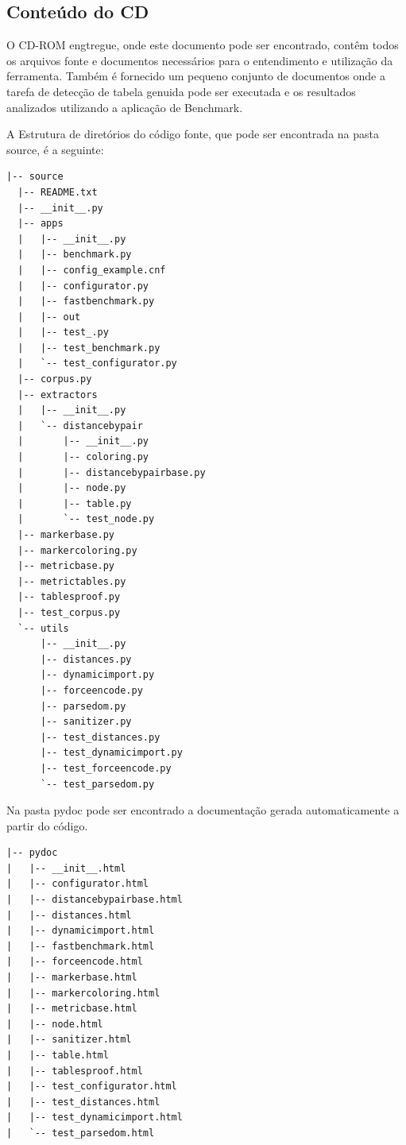 \documentclass[12pt, a4paper]{article}
\newcommand{\remove}[1]{}
\begin{document}
\remove{
A documentação do código foi realizada utilizando outro modelo padrão de
Python, o pydoc, e pode ser encontrada na pasta raiz do projeto em
formato HTML para facilitar a leitura e a busca por alguma
funcionalidade específica.
}

\subsection{Conteúdo do CD}

O CD-ROM engtregue, onde este documento pode ser encontrado, contêm
todos os arquivos fonte e documentos necessários para o entendimento e
utilização da ferramenta. Também é fornecido um pequeno conjunto de
documentos onde a tarefa de detecção de tabela genuida pode ser
executada e os resultados analizados utilizando a aplicação de Benchmark.

A Estrutura de diretórios do código fonte, que pode ser encontrada na
pasta source, é a seguinte:

\begin{verbatim}
|-- source
  |-- README.txt 
  |-- __init__.py
  |-- apps
  |   |-- __init__.py
  |   |-- benchmark.py
  |   |-- config_example.cnf
  |   |-- configurator.py
  |   |-- fastbenchmark.py
  |   |-- out
  |   |-- test_.py
  |   |-- test_benchmark.py
  |   `-- test_configurator.py
  |-- corpus.py
  |-- extractors
  |   |-- __init__.py
  |   `-- distancebypair
  |       |-- __init__.py
  |       |-- coloring.py
  |       |-- distancebypairbase.py
  |       |-- node.py
  |       |-- table.py
  |       `-- test_node.py
  |-- markerbase.py
  |-- markercoloring.py
  |-- metricbase.py
  |-- metrictables.py
  |-- tablesproof.py
  |-- test_corpus.py
  `-- utils
      |-- __init__.py
      |-- distances.py
      |-- dynamicimport.py
      |-- forceencode.py
      |-- parsedom.py
      |-- sanitizer.py
      |-- test_distances.py
      |-- test_dynamicimport.py
      |-- test_forceencode.py
      `-- test_parsedom.py
\end{verbatim}

Na pasta pydoc pode ser encontrado a documentação gerada automaticamente
a partir do código.

\begin{verbatim}
|-- pydoc
|   |-- __init__.html
|   |-- configurator.html
|   |-- distancebypairbase.html
|   |-- distances.html
|   |-- dynamicimport.html
|   |-- fastbenchmark.html
|   |-- forceencode.html
|   |-- markerbase.html
|   |-- markercoloring.html
|   |-- metricbase.html
|   |-- node.html
|   |-- sanitizer.html
|   |-- table.html
|   |-- tablesproof.html
|   |-- test_configurator.html
|   |-- test_distances.html
|   |-- test_dynamicimport.html
|   `-- test_parsedom.html
\end{verbatim}
\end{document}
